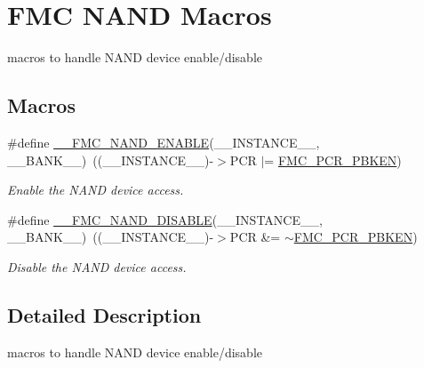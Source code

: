 \hypertarget{group___f_m_c___l_l___n_a_n_d___macros}{}\section{F\+MC N\+A\+ND Macros}
\label{group___f_m_c___l_l___n_a_n_d___macros}


macros to handle N\+A\+ND device enable/disable  


\subsection*{Macros}
\begin{DoxyCompactItemize}
\item 
\#define \hyperlink{group___f_m_c___l_l___n_a_n_d___macros_ga0169b9c61834464ceccbd73ab4c5fce7}{\+\_\+\+\_\+\+F\+M\+C\+\_\+\+N\+A\+N\+D\+\_\+\+E\+N\+A\+B\+LE}(\+\_\+\+\_\+\+I\+N\+S\+T\+A\+N\+C\+E\+\_\+\+\_\+,  \+\_\+\+\_\+\+B\+A\+N\+K\+\_\+\+\_\+)~((\+\_\+\+\_\+\+I\+N\+S\+T\+A\+N\+C\+E\+\_\+\+\_\+)-\/$>$P\+CR $\vert$= \hyperlink{group___peripheral___registers___bits___definition_ga4062c4c6a263064cc1f042bde7f86ecc}{F\+M\+C\+\_\+\+P\+C\+R\+\_\+\+P\+B\+K\+EN})
\begin{DoxyCompactList}\small\item\em Enable the N\+A\+ND device access. \end{DoxyCompactList}\item 
\#define \hyperlink{group___f_m_c___l_l___n_a_n_d___macros_ga0acd69e4346d06332021a4dea5e16666}{\+\_\+\+\_\+\+F\+M\+C\+\_\+\+N\+A\+N\+D\+\_\+\+D\+I\+S\+A\+B\+LE}(\+\_\+\+\_\+\+I\+N\+S\+T\+A\+N\+C\+E\+\_\+\+\_\+,  \+\_\+\+\_\+\+B\+A\+N\+K\+\_\+\+\_\+)~((\+\_\+\+\_\+\+I\+N\+S\+T\+A\+N\+C\+E\+\_\+\+\_\+)-\/$>$P\+CR \&= $\sim$\hyperlink{group___peripheral___registers___bits___definition_ga4062c4c6a263064cc1f042bde7f86ecc}{F\+M\+C\+\_\+\+P\+C\+R\+\_\+\+P\+B\+K\+EN})
\begin{DoxyCompactList}\small\item\em Disable the N\+A\+ND device access. \end{DoxyCompactList}\end{DoxyCompactItemize}


\subsection{Detailed Description}
macros to handle N\+A\+ND device enable/disable 



